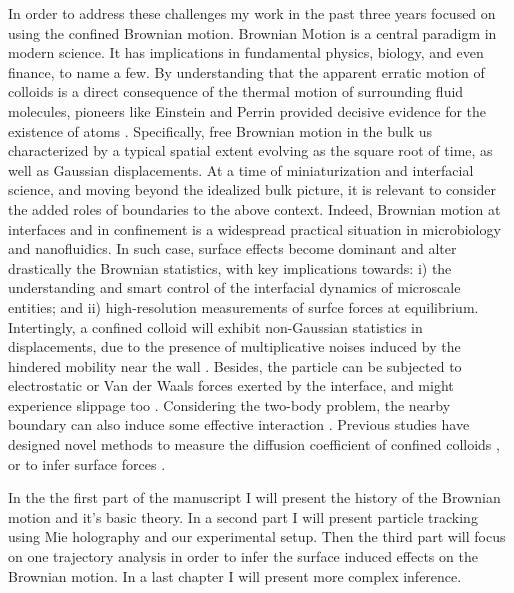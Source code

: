 In order to address these challenges my work in the past three years focused on using the confined Brownian motion. Brownian Motion is a central paradigm in modern science. It has implications in fundamental physics, biology, and even finance, to name a few. By understanding that the apparent erratic motion of colloids is a direct consequence of the thermal motion of surrounding fluid molecules, pioneers like Einstein and Perrin provided decisive evidence for the existence of atoms \cite{einstein_uber_1905,perrin_les_2014}. Specifically, free Brownian motion in the bulk us characterized by a typical spatial extent evolving as the square root of time, as well as Gaussian displacements. At a time of miniaturization and interfacial science, and moving beyond the idealized bulk picture, it is relevant to consider the added roles of boundaries to the above context. Indeed, Brownian motion at interfaces and in confinement is a widespread practical situation in microbiology and nanofluidics. In such case, surface effects become dominant and alter drastically the Brownian statistics, with key implications towards: i) the understanding and smart control of the interfacial dynamics of microscale entities; and ii) high-resolution measurements of surfce forces at equilibrium.
Intertingly, a confined colloid will exhibit non-Gaussian statistics in displacements, due to the presence of multiplicative noises induced by the hindered mobility near the wall \cite{felderhof_effect_2005, chubynsky_diffusing_2014, chechkin_brownian_2017}. Besides, the particle can be subjected to electrostatic or Van der Waals forces \cite{bouzigues_nanofluidics_2008} exerted by the interface, and might experience slippage too \cite{joly_probing_2006,mo_brownian_2017}. Considering the two-body problem, the nearby boundary can also induce some effective interaction \cite{dufresne_hydrodynamic_2000-1}. Previous studies have designed novel methods to measure the diffusion coefficient of confined colloids \cite{faucheux_confined_1994,dufresne_brownian_2001,eral_anisotropic_2010,sharma_high-precision_2010,mo_broadband_2015,matse_test_2017}, or to infer surface forces \cite{prieve_measurement_1999,banerjee_experimental_2005,sainis_statistics_2007, volpe_influence_2010, li_subfemtonewton_2019,sainis_statistics_2007-1}.

In the the first part of the manuscript I will present the history of the Brownian motion and it's basic theory. In a second part I will present particle tracking using Mie holography and our experimental setup. Then the third part will focus on one trajectory analysis in order to infer the surface induced effects on the Brownian motion. In a last chapter I will present more complex inference.


